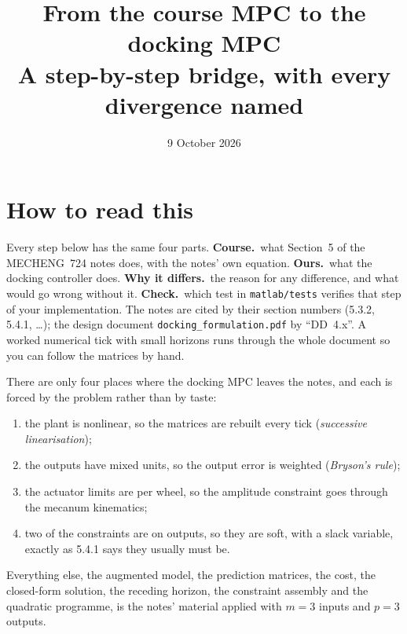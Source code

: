 \documentclass[11pt,a4paper]{article}
\title{From the course MPC to the docking MPC\\[4pt]\large A step-by-step bridge, with every divergence named}
\author{}
\date{9 October 2026}
\newcommand{\course}{\textbf{\textcolor{blue!60!black}{Course.}}\ }
\newcommand{\ours}{\textbf{\textcolor{green!45!black}{Ours.}}\ }
\newcommand{\why}{\textbf{\textcolor{red!60!black}{Why it differs.}}\ }
\newcommand{\tcheck}{\textbf{Check.}\ }
\begin{document}
\maketitle
\vspace{-1.5em}

\section*{How to read this}
Every step below has the same four parts. \course what Section~5 of the MECHENG~724 notes does, with the notes' own equation. \ours what the docking controller does. \why the reason for any difference, and what would go wrong without it. \tcheck which test in \texttt{matlab/tests} verifies that step of your implementation. The notes are cited by their section numbers (5.3.2, 5.4.1, \ldots); the design document \texttt{docking\_formulation.pdf} by ``DD~4.x''. A worked numerical tick with small horizons runs through the whole document so you can follow the matrices by hand.

There are only four places where the docking MPC leaves the notes, and each is forced by the problem rather than by taste:
\begin{enumerate}[nosep]
  \item the plant is nonlinear, so the matrices are rebuilt every tick (\emph{successive linearisation});
  \item the outputs have mixed units, so the output error is weighted (\emph{Bryson's rule});
  \item the actuator limits are per wheel, so the amplitude constraint goes through the mecanum kinematics;
  \item two of the constraints are on outputs, so they are soft, with a slack variable, exactly as 5.4.1 says they usually must be.
\end{enumerate}
Everything else, the augmented model, the prediction matrices, the cost, the closed-form solution, the receding horizon, the constraint assembly and the quadratic programme, is the notes' material applied with $m = 3$ inputs and $p = 3$ outputs.
\end{document}
